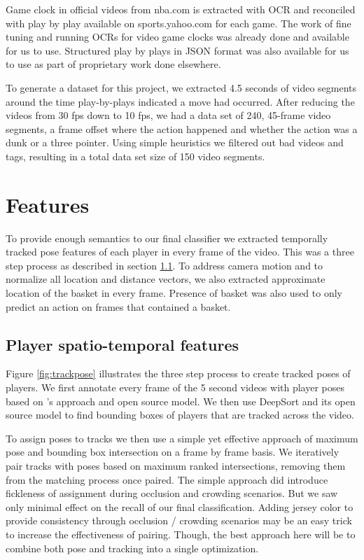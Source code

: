 \documentclass{article}
\begin{document}
Game clock in official videos from nba.com is extracted with OCR and reconciled with play by play available on sports.yahoo.com for each game. The work of fine tuning and running OCRs for video game clocks was already done and available for us to use. Structured play by plays in JSON format was also available for us to use as part of proprietary work done elsewhere.

To generate a dataset for this project, we extracted 4.5 seconds of video segments around the time play-by-plays indicated a move had occurred. After reducing the videos from 30 fps down to 10 fps, we had a data set of 240, 45-frame video segments, a frame offset where the action happened and whether the action was a dunk or a three pointer. Using simple heuristics we filtered out bad videos and tags, resulting in a total data set size of 150 video segments.

\section{Features}
\label{features}

To provide enough semantics to our final classifier we extracted temporally tracked pose features of each player in every frame of the video. This was a three step process as described in section \ref{spatiotemporal}. To address camera motion and to normalize all location and distance vectors, we also extracted approximate location of the basket in every frame. Presence of basket was also used to only predict an action on frames that contained a basket.

\subsection{Player spatio-temporal features}
\label{spatiotemporal}

Figure \ref{fig:trackpose} illustrates the three step process to create tracked poses of players. We first annotate every frame of the 5 second videos with player poses based on \cite{Cao_2017_CVPR}'s approach and open source model. We then use DeepSort \cite{Wojke2017simple} and its open source model to find bounding boxes of players that are tracked across the video. 

To assign poses to tracks we then use a simple yet effective approach of maximum pose and bounding box intersection on a frame by frame basis. We iteratively pair tracks with poses based on maximum ranked intersections, removing them from the matching process once paired. The simple approach did introduce fickleness of assignment during occlusion and crowding scenarios. But we saw only minimal effect on the recall of our final classification. Adding jersey color to provide consistency through occlusion / crowding scenarios may be an easy trick to increase the effectiveness of pairing. Though, the best approach here will be to combine both pose and tracking into a single optimization.
\end{document}
